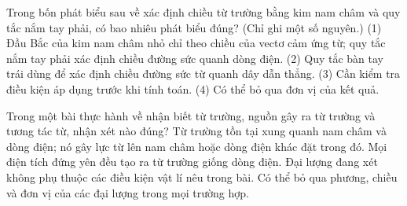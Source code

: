 \begin{ex}
Trong bốn phát biểu sau về xác định chiều từ trường bằng kim nam châm và quy tắc nắm tay phải, có bao nhiêu phát biểu đúng? (Chỉ ghi một số nguyên.) (1) Đầu Bắc của kim nam châm nhỏ chỉ theo chiều của vectơ cảm ứng từ; quy tắc nắm tay phải xác định chiều đường sức quanh dòng điện. (2) Quy tắc bàn tay trái dùng để xác định chiều đường sức từ quanh dây dẫn thẳng. (3) Cần kiểm tra điều kiện áp dụng trước khi tính toán. (4) Có thể bỏ qua đơn vị của kết quả.
\end{ex}

\begin{ex}
Trong một bài thực hành về nhận biết từ trường, nguồn gây ra từ trường và tương tác từ, nhận xét nào đúng?
\choice
{\True Từ trường tồn tại xung quanh nam châm và dòng điện; nó gây lực từ lên nam châm hoặc dòng điện khác đặt trong đó.}
{Mọi điện tích đứng yên đều tạo ra từ trường giống dòng điện.}
{Đại lượng đang xét không phụ thuộc các điều kiện vật lí nêu trong bài.}
{Có thể bỏ qua phương, chiều và đơn vị của các đại lượng trong mọi trường hợp.}
\end{ex}

